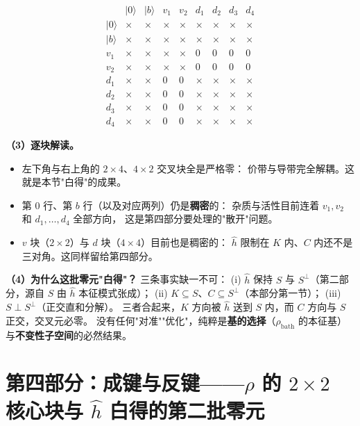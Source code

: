 \documentclass[11pt]{ctexart}
\begin{document}
\[
\begin{array}{c|cccccccc}
 & |0\rangle & |b\rangle & v_1 & v_2 & d_1 & d_2 & d_3 & d_4\\[2pt]
\hline
|0\rangle & \times & \times & \times & \times & \times & \times & \times & \times\\[2pt]
|b\rangle & \times & \times & \times & \times & \times & \times & \times & \times\\[2pt]
v_1 & \times & \times & \times & \times & 0 & 0 & 0 & 0\\[2pt]
v_2 & \times & \times & \times & \times & 0 & 0 & 0 & 0\\[2pt]
d_1 & \times & \times & 0 & 0 & \times & \times & \times & \times\\[2pt]
d_2 & \times & \times & 0 & 0 & \times & \times & \times & \times\\[2pt]
d_3 & \times & \times & 0 & 0 & \times & \times & \times & \times\\[2pt]
d_4 & \times & \times & 0 & 0 & \times & \times & \times & \times
\end{array}
\]

\textbf{（3）逐块解读。}

\begin{itemize}
\item 左下角与右上角的 $2\times4$、$4\times2$ 交叉块全是严格零：
价带与导带完全解耦。这就是本节"白得"的成果。
\item 第 $0$ 行、第 $b$ 行（以及对应两列）仍是\textbf{稠密}的：
杂质与活性目前连着 $v_1,v_2$ 和 $d_1,\dots,d_4$ 全部方向，
这是第四部分要处理的"散开"问题。
\item $v$ 块（$2\times2$）与 $d$ 块（$4\times4$）目前也是稠密的：
$\hat h$ 限制在 $K$ 内、$C$ 内还不是三对角。这同样留给第四部分。
\end{itemize}

\textbf{（4）为什么这批零元"白得"？}
三条事实缺一不可：
(i) $\hat h$ 保持 $S$ 与 $S^{\perp}$（第二部分，源自 $S$ 由 $\hat h$ 本征模式张成）；
(ii) $K\subseteq S$、$C\subseteq S^{\perp}$（本部分第一节）；
(iii) $S\perp S^{\perp}$（正交直和分解）。
三者合起来，$K$ 方向被 $\hat h$ 送到 $S$ 内，而 $C$ 方向与 $S$ 正交，交叉元必零。
没有任何"对准""优化"，纯粹是\textbf{基的选择}（$\rho_{\mathrm{bath}}$ 的本征基）
与\textbf{不变性子空间}的必然结果。

\medskip
\section*{第四部分：成键与反键——$\rho$ 的 $2\times2$ 核心块与 $\hat h$ 白得的第二批零元}
\end{document}
